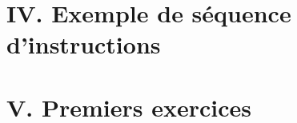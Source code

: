 

\usepackage{parcolumns}
\setlength{\parindent}{0pt}

 

%

\section*{IV. Exemple de séquence d'instructions}


\section*{V. Premiers exercices}

